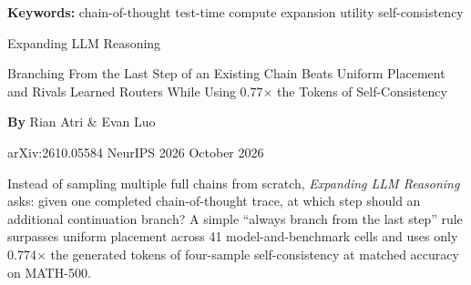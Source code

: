 \documentclass[10pt,twocolumn]{article}
\begin{document}
\setlength{\parindent}{0pt}
\setlength{\parskip}{4pt}

{\small\color{keywordgray}\textbf{Keywords:}
  chain-of-thought \textbullet{}
  test-time compute \textbullet{}
  expansion utility \textbullet{}
  self-consistency}\par\vspace{4pt}

{\LARGE\bfseries\raggedright
  Expanding LLM Reasoning}\par\vspace{4pt}

{\large\itshape\raggedright
  Branching From the Last Step of an Existing Chain Beats Uniform Placement
  and Rivals Learned Routers While Using 0.77$\times$ the Tokens of
  Self-Consistency}\par\vspace{6pt}

{\small\textbf{By} Rian Atri \& Evan Luo}\par\vspace{2pt}

{\small\color{keywordgray}arXiv:2610.05584 \textbullet{} NeurIPS 2026 \textbullet{} October 2026}
\par\vspace{2pt}\noindent{\color{rulered}\rule{\columnwidth}{0.6pt}}\vspace{6pt}

Instead of sampling multiple full chains from scratch, \emph{Expanding LLM
Reasoning} asks: given one completed chain-of-thought trace, at which step
should an additional continuation branch? A simple ``always branch from the
last step'' rule surpasses uniform placement across 41 model-and-benchmark
cells and uses only 0.774$\times$ the generated tokens of four-sample
self-consistency at matched accuracy on MATH-500.
\end{document}
